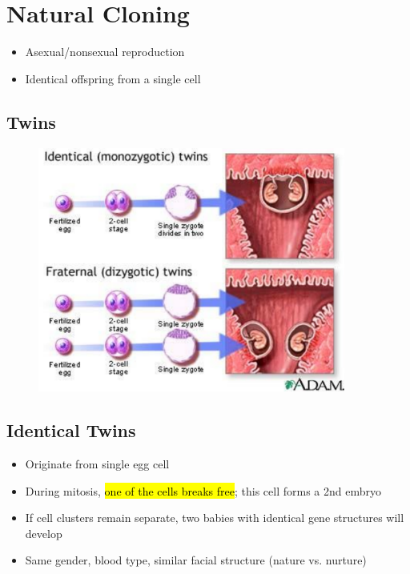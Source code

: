 \documentclass[a4paper,12pt]{article}
\begin{document}
\section{Natural Cloning}
\begin{itemize}
    \item{Asexual/nonsexual reproduction}
    \item{Identical offspring from a single cell}
\end{itemize}

\subsection{Twins}
\begin{figure}[H]
    \centering
    \includegraphics[width=0.9\textwidth]{twins}
\end{figure}

\subsection{Identical Twins}
\begin{itemize}
    \item{Originate from single egg cell}
    \item{During mitosis, \hl{one of the cells breaks free}; this cell forms a 2nd embryo}
    \item{If cell clusters remain separate, two babies with identical gene structures will develop}
    \item{Same gender, blood type, similar facial structure (nature vs. nurture)}
\end{itemize}
\end{document}

